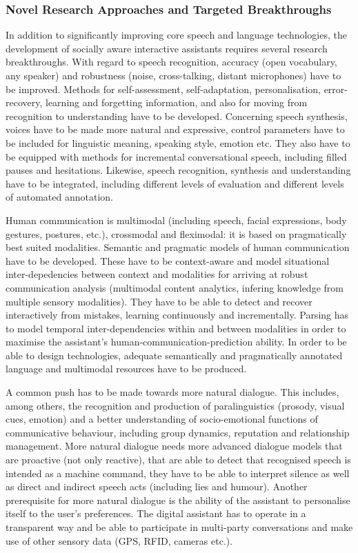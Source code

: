 \documentclass[10pt, plain]{../../metanetpaper}
\begin{document}
\begin{multicols}{2}
\subsubsection{Novel Research Approaches and Targeted Breakthroughs}
\label{sec:novel-rese-appr-pt3}

In addition to significantly improving core speech and language technologies, the development of socially aware interactive assistants requires several research breakthroughs. With regard to speech recognition, accuracy (open vocabulary, any speaker) and robustness (noise, cross-talking, distant microphones) have to be improved. Methods for self-assessment, self-adaptation, personalisation, error-recovery, learning and forgetting information, and also for moving from recognition to understanding have to be developed. Concerning speech synthesis, voices have to be made more natural and expressive, control parameters have to be included for linguistic meaning, speaking style, emotion etc. They also have to be equipped with methods for incremental conversational speech, including filled pauses and hesitations. Likewise, speech recognition, synthesis and understanding have to be integrated, including different levels of evaluation and different levels of automated annotation.

Human communication is multimodal (including speech, facial expressions, body gestures, postures, etc.), crossmodal and fleximodal: it is based on pragmatically best suited modalities. Semantic and pragmatic models of human communication have to be developed. These have to be context-aware and model situational inter-depedencies between context and modalities for arriving at robust communication analysis (multimodal content analytics, infering knowledge from multiple sensory modalities). They have to be able to detect and recover interactively from mistakes, learning continuously and incrementally. Parsing has to model temporal inter-dependencies within and between modalities in order to maximise the assistant's human-communication-prediction ability. In order to be able to design technologies, adequate semantically and pragmatically annotated language and multimodal resources have to be produced.

A common push has to be made towards more natural dialogue. This includes, among others, the recognition and production of paralinguistics (prosody, visual cues, emotion) and a better understanding of socio-emotional functions of communicative behaviour, including group dynamics, reputation and relationship management. More natural dialogue needs more advanced dialogue models that are proactive (not only reactive), that are able to detect that recognised speech is intended as a machine command, they have to be able to interpret silence as well as direct and indirect speech acts (including lies and humour). Another prerequisite for more natural dialogue is the ability of the assistant to personalise itself to the user's preferences. The digital assistant has to operate in a transparent way and be able to participate in multi-party conversations and make use of other sensory data (GPS, RFID, cameras etc.).


\end{multicols}
\end{document}
